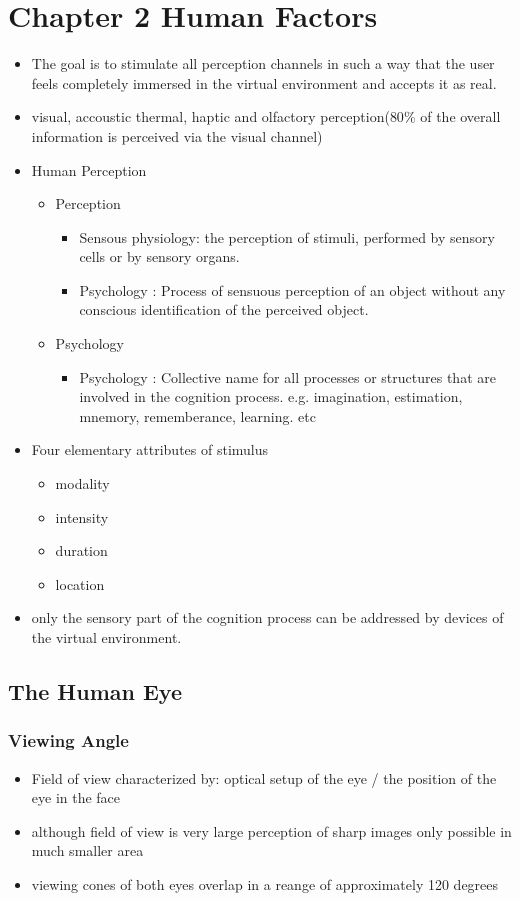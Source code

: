 \documentclass{standalone}
\begin{document}
\section{Chapter 2 Human Factors}
\begin{itemize}
	\item The goal is to stimulate all perception channels in such a way that the user feels completely immersed in the virtual environment and accepts it as real.
	\item visual, accoustic thermal, haptic and olfactory perception($80 \%$ of the overall information is perceived via the visual channel)
	\item Human Perception
	\begin{itemize}
		\item Perception
		\begin{itemize}
			\item Sensous physiology: the perception of stimuli, performed by sensory cells or by sensory organs.
			\item Psychology : Process of sensuous perception of an object without any conscious identification of the perceived object.
		\end{itemize}
		\item Psychology
		\begin{itemize}
			\item Psychology : Collective name for all processes or structures that are involved in the cognition process. e.g. imagination, estimation, mnemory, rememberance, learning. etc
		\end{itemize}
	\end{itemize}

	\item Four elementary attributes of stimulus
	\begin{itemize}
		\item modality
		\item intensity
		\item duration
		\item location
	\end{itemize}
	\item only the sensory part of the cognition process can be addressed by devices of the virtual environment. 
\end{itemize}

\subsection{The Human Eye}
\subsubsection{Viewing Angle}
\begin{itemize}
	\item Field of view characterized by: optical setup of the eye / the position of the eye in the face
	\item although field of view is very large perception of sharp images only possible in much smaller area
	\item viewing cones of both eyes overlap in a reange of approximately 120 degrees
\end{itemize}
\end{document}
